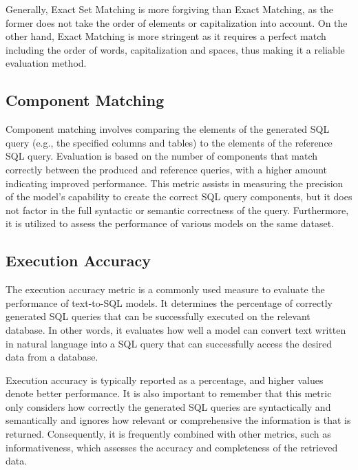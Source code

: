 Generally, Exact Set Matching is more forgiving than Exact Matching, as the former does not take the order of elements or capitalization into account. On the other hand, Exact Matching is more stringent as it requires a perfect match including the order of words, capitalization and spaces, thus making it a reliable evaluation method.


\subsection{Component Matching}

Component matching\cite{yu_spider_2019} involves comparing the elements of the generated SQL query (e.g., the specified columns and tables) to the elements of the reference SQL query. Evaluation is based on the number of components that match correctly between the produced and reference queries, with a higher amount indicating improved performance. This metric assists in measuring the precision of the model's capability to create the correct SQL query components, but it does not factor in the full syntactic or semantic correctness of the query. Furthermore, it is utilized to assess the performance of various models on the same dataset.

\subsection{Execution Accuracy}

The execution accuracy metric\cite{yu_spider_2019} is a commonly used measure to evaluate the performance of text-to-SQL models. It determines the percentage of correctly generated SQL queries that can be successfully executed on the relevant database. In other words, it evaluates how well a model can convert text written in natural language into a SQL query that can successfully access the desired data from a database.

Execution accuracy is typically reported as a percentage, and higher values denote better performance. It is also important to remember that this metric only considers how correctly the generated SQL queries are syntactically and semantically and ignores how relevant or comprehensive the information is that is returned. Consequently, it is frequently combined with other metrics, such as informativeness, which assesses the accuracy and completeness of the retrieved data.
